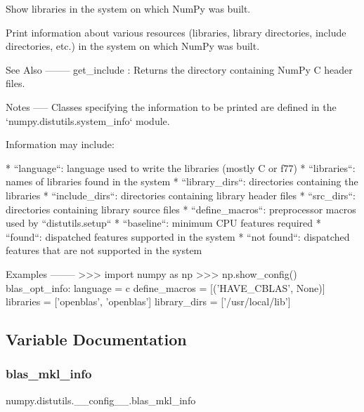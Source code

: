 \begin{DoxyVerb}Show libraries in the system on which NumPy was built.

Print information about various resources (libraries, library
directories, include directories, etc.) in the system on which
NumPy was built.

See Also
--------
get_include : Returns the directory containing NumPy C
              header files.

Notes
-----
Classes specifying the information to be printed are defined
in the `numpy.distutils.system_info` module.

Information may include:

* ``language``: language used to write the libraries (mostly
  C or f77)
* ``libraries``: names of libraries found in the system
* ``library_dirs``: directories containing the libraries
* ``include_dirs``: directories containing library header files
* ``src_dirs``: directories containing library source files
* ``define_macros``: preprocessor macros used by
  ``distutils.setup``
* ``baseline``: minimum CPU features required
* ``found``: dispatched features supported in the system
* ``not found``: dispatched features that are not supported
  in the system

Examples
--------
>>> import numpy as np
>>> np.show_config()
blas_opt_info:
    language = c
    define_macros = [('HAVE_CBLAS', None)]
    libraries = ['openblas', 'openblas']
    library_dirs = ['/usr/local/lib']
\end{DoxyVerb}
 

\subsection{Variable Documentation}
\mbox{\label{namespacenumpy_1_1distutils_1_1____config_____a80adce35b658ba404c96caf4ac6b5b34}} 
\subsubsection{\texorpdfstring{blas\+\_\+mkl\+\_\+info}{blas\_mkl\_info}}
{\footnotesize\ttfamily numpy.\+distutils.\+\_\+\+\_\+config\+\_\+\+\_\+.\+blas\+\_\+mkl\+\_\+info}

